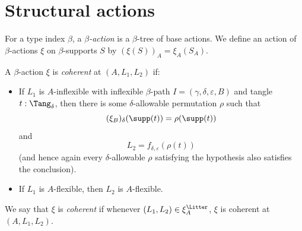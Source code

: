 \section{Structural actions}
\begin{definition}
  \label{def:StrAction}
  For a type index \( \beta \), a \emph{\( \beta \)-action} is a \( \beta \)-tree of base actions.
  We define an action of \( \beta \)-actions \( \xi \) on \( \beta \)-supports \( S \) by \( (\xi(S))_A = \xi_A(S_A) \).
\end{definition}
\begin{definition}
  \label{def:StrAction.Coherent}
  A \( \beta \)-action \( \xi \) is \emph{coherent} at \( (A, L_1, L_2) \) if:
  \begin{itemize}
    \item If \( L_1 \) is \( A \)-inflexible with inflexible \( \beta \)-path \( I = (\gamma, \delta, \varepsilon, B) \) and tangle \( t : \Tang_\delta \), then there is some \( \delta \)-allowable permutation \( \rho \) such that
    \[ (\xi_B)_\delta(\supp(t)) = \rho(\supp(t)) \]
    and
    \[ L_2 = f_{\delta,\varepsilon}(\rho(t)) \]
    (and hence again every \( \delta \)-allowable \( \rho \) satisfying the hypothesis also satisfies the conclusion).
    \item If \( L_1 \) is \( A \)-flexible, then \( L_2 \) is \( A \)-flexible.
  \end{itemize}
  We say that \( \xi \) is \emph{coherent} if whenever \( (L_1, L_2) \in \xi_A^\Litter \), \( \xi \) is coherent at \( (A, L_1, L_2) \).
\end{definition}
